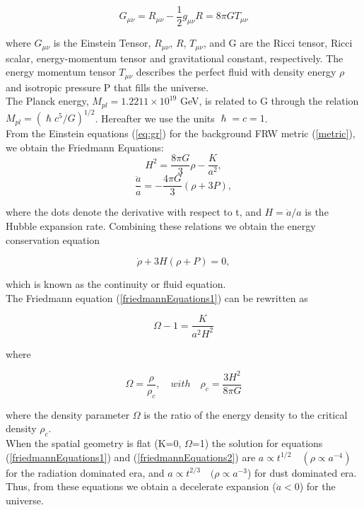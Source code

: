 \documentclass[11pt,a4paper,twoside]{book}
\begin{document}
\begin{equation}
	\label{eq:gr}
	G_{\mu\nu}  = R_{\mu\nu} - \frac{1}{2}g_{\mu\nu}R=8\pi G T_{\mu\nu}
\end{equation}

where $ G_{\mu\nu} $ is the Einstein Tensor, $ R_{\mu\nu} $, $ R $, $ T_{\mu\nu}$, and G are the Ricci tensor, Ricci scalar, energy-momentum tensor and gravitational constant, respectively. The energy momentum tensor $ T_{\mu\nu} $ describes the perfect fluid with density energy $ \rho $ and isotropic pressure P that fills the universe.\\
The Planck energy, $M_{pl}=1.2211 \times 10^{19}$ GeV, is related to G through the relation $ M_{pl} = (\hslash c^{5}/G)^{1/2}$. Hereafter we use the units $ \hslash = c = 1 $.\\
From the Einstein equations (\ref{eq:gr}) for the background FRW metric (\ref{metric}), we obtain the Friedmann Equations:
\begin{equation}
	\label{friedmannEquations1}
	H^{2}=\frac{8\pi G}{3}\rho - \frac{K}{a^{2}},
\end{equation}
\begin{equation}
	\label{friedmannEquations2}	
	\frac{\ddot{a}}{a} = -\frac{4\pi G}{3}(\rho + 3P),
\end{equation}

where the dots denote the derivative with respect to t, and $ H=\dot{a}/a $ is the Hubble expansion rate. Combining these relations we obtain the energy conservation equation 

\begin{equation}
	\label{energyCons}
	\dot{\rho} + 3H(\rho + P)=0,
\end{equation}

which is known as the continuity or fluid equation.\\
The Friedmann equation (\ref{friedmannEquations1}) can be rewritten as 

\begin{equation}
	\label{densityParameter}
	\Omega - 1 = \frac{K}{a^{2}H^{2}}
\end{equation}

where 

\begin{equation}
	\label{criticalDensity}
	\Omega=\frac{\rho}{\rho_{c}}, \quad    with \quad   \rho_{c}=\frac{3H^{2}}{8\pi G}
\end{equation}

where the density parameter $ \Omega $ is the ratio of the energy density to the critical density $ \rho_{c} $.\\
When the spatial geometry is flat (K=0, $ \Omega $=1) the solution for equations (\ref{friedmannEquations1})
and (\ref{friedmannEquations2}) are $ a \propto t^{1/2} \quad  (\rho \propto a^{-4}) $ for the radiation dominated era, and $ a\propto t^{2/3} \quad  (  \rho \propto  a^{-3}$) for dust dominated era.\\
Thus, from these equations we obtain a decelerate expansion ($ \ddot{a} < 0 $) for the universe.\\
\end{document}
